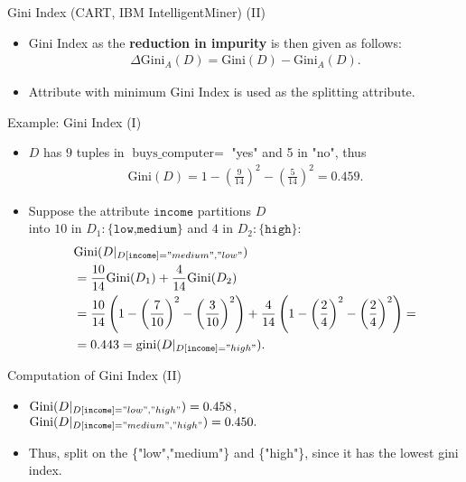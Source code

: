 \begin{frame}{Gini Index (CART, IBM IntelligentMiner) (II)}
	\begin{itemize}
		\item Gini Index as the \textbf{reduction in impurity} is then given as
		      follows:
		      \begin{align*}
			      \Delta\text{Gini}_A(D) = \text{Gini}(D)-\text{Gini}_A(D).
		      \end{align*}
		\item Attribute with minimum Gini Index is used as the splitting attribute.
	\end{itemize}

\end{frame}

\begin{frame}{Example: Gini Index (I)}
	\begin{itemize}
		\item $D$ has $9$ tuples in $\text{buys\_computer} =$ "yes" and 5 in "no", thus
		      \begin{align*}
			      \text{Gini}(D) = 1 - \left( \frac{9}{14} \right)^2 - \left( \frac{5}{14} \right)^2 = 0.459.
		      \end{align*}
		\item Suppose the attribute $\texttt{income}$ partitions $D$ \\ into $10$ in
		      $D_1:\{\texttt{low,medium}\}$ and $4$ in $D_2: \{\texttt{high}\}$:
		      \begin{align*}
			       & \text{Gini}(D\vert_{D[\texttt{income}]="medium", "low"})                                                                                                                                   \\
			       & = \frac{10}{14} \text{Gini}(D_1) + \frac{4}{14} \text{Gini}(D_2)                                                                                                                           \\
			       & =\frac{10}{14} \left(1-\left( \frac{7}{10} \right)^2 - \left( \frac{3}{10} \right)^2 \right) + \frac{4}{14} \left( 1-\left( \frac{2}{4} \right)^2 - \left( \frac{2}{4} \right)^2 \right) = \\
			       & = 0.443 = \text{gini}(D\vert_{D[\texttt{income}]="high"}).
		      \end{align*}
	\end{itemize}
\end{frame}

\begin{frame}{Computation of Gini Index (II)}
	\begin{itemize}
		\item $\text{Gini}(D\vert_{D[\texttt{income}]="low", "high"}) = 0.458$,\\
		      $\text{Gini}(D\vert_{D[\texttt{income}]="medium", "high"}) = 0.450.$
		\item Thus, split on the \{"low","medium"\} and \{"high"\}, since it has the lowest gini index.
	\end{itemize}
\end{frame}

